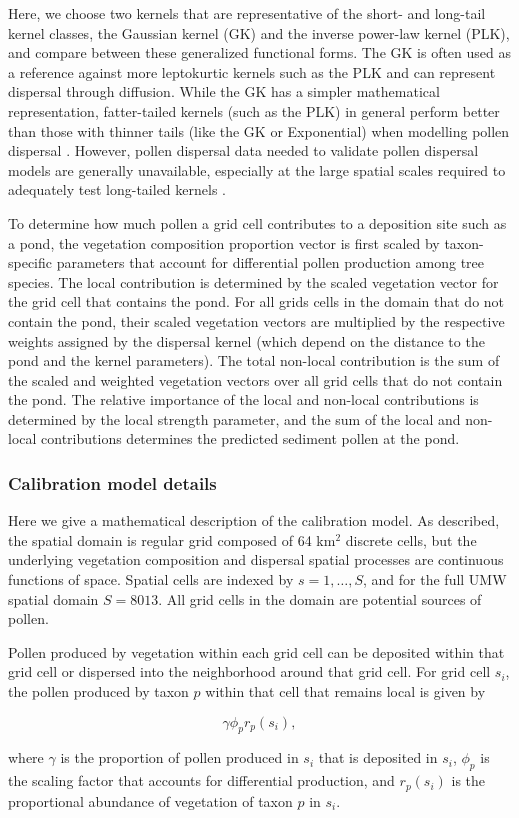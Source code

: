 \documentclass[12pt]{article}
\begin{document}
Here, we choose two kernels that are representative of the short- and
long-tail kernel classes, the Gaussian kernel (GK) and the inverse
power-law kernel (PLK), and compare between these generalized
functional forms. The GK is often used as a reference against more
leptokurtic kernels such as the PLK and can represent dispersal
through diffusion. While the GK has a simpler mathematical
representation, fatter-tailed kernels (such as the PLK) in general
perform better than those with thinner tails (like the GK or
Exponential) when modelling pollen dispersal
\citep{devaux2007modelling, austerlitz2004using}. However, pollen
dispersal data needed to validate pollen dispersal models are
generally unavailable, especially at the large spatial scales required
to adequately test long-tailed kernels \citep{clobert2012dispersal}.

To determine how much pollen a grid cell contributes to a deposition
site such as a pond, the vegetation composition proportion vector is
first scaled by taxon-specific parameters that account for
differential pollen production among tree species. The local
contribution is determined by the scaled vegetation vector for the
grid cell that contains the pond. For all grids cells in the domain
that do not contain the pond, their scaled vegetation vectors are
multiplied by the respective weights assigned by the dispersal kernel
(which depend on the distance to the pond and the kernel
parameters). The total non-local contribution is the sum of the scaled
and weighted vegetation vectors over all grid cells that do not
contain the pond. The relative importance of the local and non-local
contributions is determined by the local strength parameter, and the
sum of the local and non-local contributions determines the predicted
sediment pollen at the pond.

\subsubsection*{Calibration model details}

Here we give a mathematical description of the calibration model. As
described, the spatial domain is regular grid composed of 64 km$^2$
discrete cells, but the underlying vegetation composition and
dispersal spatial processes are continuous functions of space. Spatial
cells are indexed by $s=1,\ldots,S$, and for the full UMW
spatial domain $S=8013$. All grid cells in the domain are potential
sources of pollen.

Pollen produced by vegetation within each grid cell can be deposited
within that grid cell or dispersed into the neighborhood around that
grid cell. For grid cell $s_i$, the pollen produced by taxon $p$
within that cell that remains local is given by
\begin{linenomath*}
\begin{equation}
\gamma \phi_p r_p(s_i),
\end{equation} 
\end{linenomath*}
where $\gamma$ is the proportion of pollen produced in $s_i$ that is
deposited in $s_i$, $\phi_p$ is the scaling factor that accounts for
differential production, and $r_p(s_i)$ is the proportional abundance
of vegetation of taxon $p$ in $s_i$.
\end{document}
